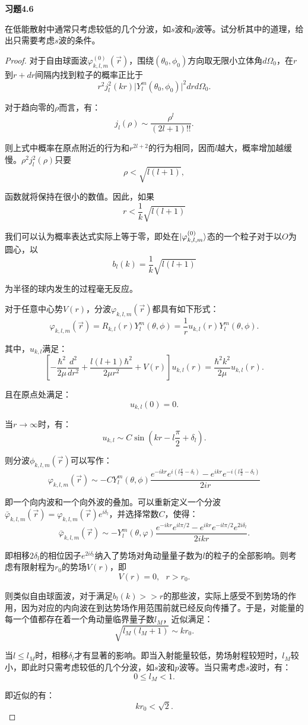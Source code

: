 \documentclass[reqno,a4paper,12pt]{amsart}
\begin{document}
\medskip

\textbf{习题4.6}

在低能散射中通常只考虑较低的几个分波，如$s$波和$p$波等。试分析其中的道理，给出只需要考虑$s$波的条件。

\begin{proof}
对于自由球面波$\varphi_{k,l,m}^{(0)}(\vec{r})$，围绕$(\theta_0, \phi_0)$方向取无限小立体角$d\Omega_0$，在$r$到$r+dr$间隔内找到粒子的概率正比于
\[
	r^2 j_l^2(kr) \vert Y_l^m(\theta_0, \phi_0) \vert^2 drd\Omega_0.
\]

对于趋向零的$\rho$而言，有：
\[
	j_l(\rho) \sim \frac{\rho^l}{(2l+1)!!}.
\]

则上式中概率在原点附近的行为和$r^{2l+2}$的行为相同，因而$l$越大，概率增加越缓慢。$\rho^2 j_l^2(\rho)$只要
\[
	\rho < \sqrt{l(l+1)},
\]

函数就将保持在很小的数值。因此，如果
\[
	r < \frac{1}{k}\sqrt{l(l+1)}
\]

我们可以认为概率表达式实际上等于零，即处在$\ket{\varphi_{k,l,m}^{(0)}}$态的一个粒子对于以$O$为圆心，以
\[
	b_l(k) = \frac{1}{k}\sqrt{l(l+1)}
\]

为半径的球内发生的过程毫无反应。

对于任意中心势$V(r)$，分波$\varphi_{k,l,m}(\vec{r})$都具有如下形式：
\[
	\varphi_{k,l,m}(\vec{r}) = R_{k,l}(r) Y_l^m (\theta, \phi) = \frac{1}{r} u_{k,l}(r) Y_l^m(\theta, \phi).
\]

其中，$u_{k,l}$满足：
\[
	\left[ -\frac{\hbar^2}{2\mu}\frac{d^2}{dr^2} + \frac{l(l+1)\hbar^2}{2\mu r^2} + V(r) \right]u_{k,l}(r) = \frac{\hbar^2k^2}{2\mu} u_{k,l}(r).
\]

且在原点处满足：
\[
	u_{k,l}(0) = 0.
\]

当$r\to \infty$时，有：
\[
	u_{k,l} \sim C \sin\left( kr - l\frac{\pi}{2} + \delta_l \right).
\]

则分波$\phi_{k,l,m}(\vec{r})$可以写作：
\[
	\varphi_{k,l,m}(\vec{r}) \sim -CY_l^m(\theta, \phi) \frac{e^{-ikr} e^{i\left( l\frac{\pi}{2}-\delta_l \right)} - e^{ikr} e^{-i\left( l\frac{\pi}{2}-\delta_l \right)}}{2ir}
\]

即一个向内波和一个向外波的叠加。可以重新定义一个分波$\bar{\varphi}_{k,l,m}(\vec{r}) = \varphi_{k,l,m}(\vec{r}) e^{i\delta_l}$，并选择常数$C$，使得：
\[
	\bar{\varphi}_{k,l,m}(\vec{r}) \sim -Y_l^m(\theta, \varphi) \frac{e^{-ikr} e^{il\pi/2} - e^{ikr} e^{-il\pi/2} e^{2i\delta_l}}{2ikr}.
\]

即相移$2\delta_l$的相位因子$e^{2i\delta_l}$纳入了势场对角动量量子数为$l$的粒子的全部影响。则考虑有限射程为$r_0$的势场$V(r)$，即
\[
	V(r) = 0, \ \ \ r>r_0.
\]

则类似自由球面波，对于满足$b_l(k) >> r$的那些波，实际上感受不到势场的作用，因为对应的内向波在到达势场作用范围前就已经反向传播了。于是，对能量的每一个值都存在着一个角动量临界量子数$l_M$，近似满足：
\[
	\sqrt{l_M(l_M + 1)} \sim kr_0.
\]

当$l\leq l_M$时，相移$\delta_l$才有显著的影响。即当入射能量较低，势场射程较短时，$l_M$较小，即此时只需考虑较低的几个分波，如$s$波和$p$波等。当只需考虑$s$波时，有：
\[
	0 \leq l_M < 1.
\]

即近似的有：
\[
	kr_0 < \sqrt{2}.
\]
\end{proof}
\end{document}
